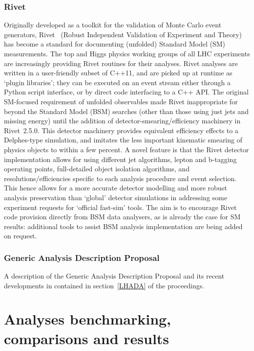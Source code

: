 \documentclass[11pt]{cernrep}
\begin{document}
\subsubsection{Rivet}
Originally developed as a toolkit for the validation of Monte Carlo event
generators, Rivet~\cite{rivet} (Robust Independent Validation of Experiment and
Theory) has become a standard for documenting (unfolded) Standard Model (SM)
measurements. The top and Higgs physics working groups of all LHC experiments
are increasingly providing Rivet routines for their analyses. Rivet analyses are
written in a user-friendly subset of C++11, and are picked up at runtime as
`plugin libraries'; they can be executed on an event stream either through a Python script interface, or by direct code interfacing to a C++ API.
The original SM-focused requirement of unfolded observables made Rivet
inappropriate for beyond the Standard Model (BSM) searches (other than those
using just jets and missing energy) until the addition of
detector-smearing/efficiency machinery in Rivet~2.5.0. This detector machinery provides equivalent efficiency effects to a Delphes-type simulation, and imitates the less important kinematic smearing of physics objects to within a few percent. A novel feature is that the Rivet detector implementation allows for using
different jet algorithms, lepton and b-tagging operating points, full-detailed object isolation algorithms, and resolutions/efficiencies specific to each
analysis procedure and event selection. This hence allows for a more accurate detector modelling and more robust analysis preservation than `global' detector simulations in addressing some experiment requests for `official fast-sim' tools. The aim is to encourage Rivet code provision directly from BSM data analysers, as is already the case for SM results: additional tools to assist BSM analysis implementation are being added on request.

\subsubsection{Generic Analysis Description Proposal}
A description of the Generic Analysis Description Proposal and its recent developments in contained in section~\ref{LHADA} of the proceedings.

\section{Analyses benchmarking, comparisons and results}
\end{document}
